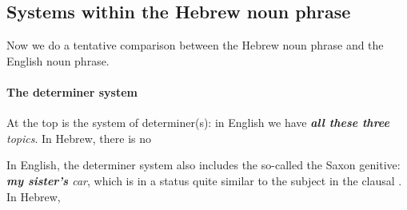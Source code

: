 \documentclass[a4paper, oneside, 12pt]{report}
\newcommand*{\citepages}[1]{pp.~{#1}}
\newcommand{\form}[1]{\emph{#1}}
\begin{document}
\subsection{Systems within the Hebrew noun phrase}

Now we do a tentative comparison between the Hebrew noun phrase and the English noun phrase.

\paragraph*{The determiner system}
At the top is the system of determiner(s):
in English we have \form{\textbf{all these three} topics}.
In Hebrew, there is no 

In English, the determiner system also includes the so-called the Saxon genitive:
\form{\textbf{my sister's} car}, which is in a status quite similar to the subject in the clausal
\citep[\citepages{468,472-478}]{cgel}.
In Hebrew, 
\end{document}

